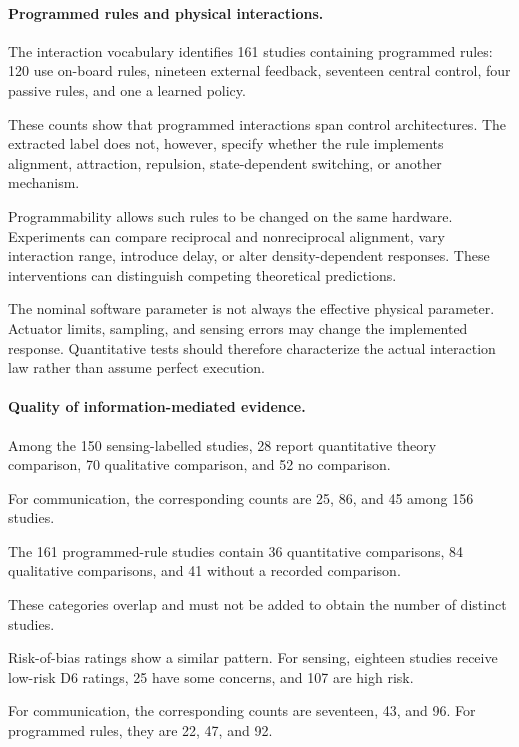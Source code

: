 \paragraph*{Programmed rules and physical interactions.}

The interaction vocabulary identifies
161 studies containing programmed rules:
120 use on-board rules,
nineteen external feedback,
seventeen central control,
four passive rules,
and one a learned policy.

These counts show that programmed
interactions span control architectures.
The extracted label does not, however,
specify whether the rule implements
alignment, attraction, repulsion,
state-dependent switching,
or another mechanism.

Programmability allows such rules
to be changed on the same hardware.
Experiments can compare reciprocal
and nonreciprocal alignment, vary
interaction range, introduce delay,
or alter density-dependent responses.
These interventions can distinguish
competing theoretical predictions.

The nominal software parameter
is not always the effective physical
parameter. Actuator limits, sampling,
and sensing errors may change the
implemented response. Quantitative
tests should therefore characterize
the actual interaction law rather
than assume perfect execution.

\paragraph*{Quality of information-mediated evidence.}

Among the 150 sensing-labelled studies,
28 report quantitative theory comparison,
70 qualitative comparison,
and 52 no comparison.

For communication, the corresponding
counts are 25, 86, and 45
among 156 studies.

The 161 programmed-rule studies contain
36 quantitative comparisons,
84 qualitative comparisons,
and 41 without a recorded comparison.

These categories overlap and must
not be added to obtain the number
of distinct studies.

Risk-of-bias ratings show a similar
pattern. For sensing, eighteen studies
receive low-risk D6 ratings,
25 have some concerns,
and 107 are high risk.

For communication, the corresponding
counts are seventeen, 43, and 96.
For programmed rules, they are
22, 47, and 92.

